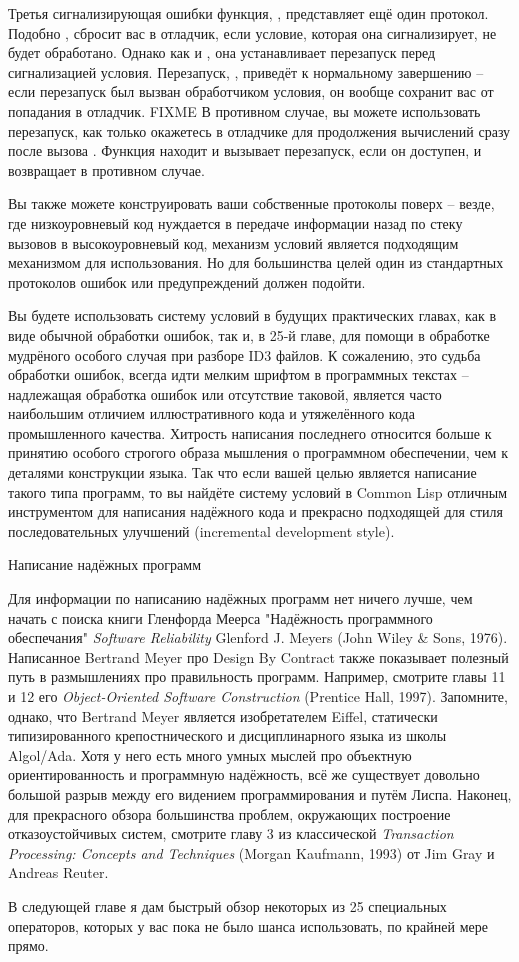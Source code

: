 Третья сигнализирующая ошибки функция, , представляет ещё один
протокол. Подобно ,  сбросит вас в отладчик, если условие,
которая она сигнализирует, не будет обработано. Однако как и , она
устанавливает перезапуск перед сигнализацией условия. Перезапуск, ,
приведёт к нормальному завершению  -- если перезапуск был вызван обработчиком
условия, он вообще сохранит вас от попадания в отладчик. FIXME В противном случае, вы
можете использовать перезапуск, как только окажетесь в отладчике для продолжения
вычислений сразу после вызова . Функция  находит и вызывает
 перезапуск, если он доступен, и возвращает  в противном случае.

Вы также можете конструировать ваши собственные протоколы поверх  -- везде,
где низкоуровневый код нуждается в передаче информации назад по стеку вызовов в
высокоуровневый код, механизм условий является подходящим механизмом для использования. Но
для большинства целей один из стандартных протоколов ошибок или предупреждений должен
подойти.

Вы будете использовать систему условий в будущих практических главах, как в виде обычной
обработки ошибок, так и, в 25-й главе, для помощи в обработке мудрёного особого случая при
разборе ID3 файлов.  К сожалению, это судьба обработки ошибок, всегда идти мелким шрифтом
в программных текстах -- надлежащая обработка ошибок или отсутствие таковой, является
часто наибольшим отличием иллюстративного кода и утяжелённого кода промышленного
качества. Хитрость написания последнего относится больше к принятию особого строгого
образа мышления о программном обеспечении, чем к деталями конструкции языка. Так что если
вашей целью является написание такого типа программ, то вы найдёте систему условий в
Common Lisp отличным инструментом для написания надёжного кода и прекрасно подходящей для
стиля последовательных улучшений (incremental development style).


Написание надёжных программ 

Для информации по написанию надёжных программ нет ничего лучше, чем начать с поиска книги
Гленфорда Меерса "Надёжность программного обеспечания" \textit{Software Reliability}
Glenford J. Meyers (John Wiley \& Sons, 1976). Написанное Bertrand Meyer про Design By
Contract также показывает полезный путь в размышлениях про правильность
программ. Например, смотрите главы 11 и 12 его \textit{Object-Oriented Software
  Construction} (Prentice Hall, 1997). Запомните, однако, что Bertrand Meyer является
изобретателем Eiffel, статически типизированного крепостнического и дисциплинарного языка
из школы Algol/Ada. Хотя у него есть много умных мыслей про объектную ориентированность и
программную надёжность, всё же существует довольно большой разрыв между его видением
программирования и путём Лиспа. Наконец, для прекрасного обзора большинства проблем,
окружающих построение отказоустойчивых систем, смотрите главу 3 из классической
\textit{Transaction Processing: Concepts and Techniques} (Morgan Kaufmann, 1993) от Jim
Gray и Andreas Reuter.


В следующей главе я дам быстрый обзор некоторых из 25 специальных операторов, которых у
вас пока не было шанса использовать, по крайней мере прямо.

